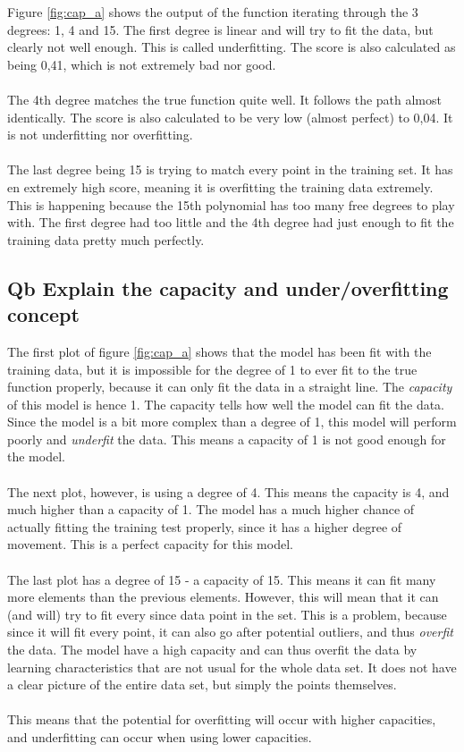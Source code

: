\documentclass{article}
\begin{document}
Figure \ref{fig:cap_a} shows the output of the function iterating through the 3 degrees: 1, 4 and 15. The first degree is linear and will try to fit the data, but clearly not well enough. This is called underfitting. The score is also calculated as being 0,41, which is not extremely bad nor good. 
\\ \\
The 4th degree matches the true function quite well. It follows the path almost identically. The score is also calculated to be very low (almost perfect) to 0,04. It is not underfitting nor overfitting.
\\ \\
The last degree being 15 is trying to match every point in the training set. It has en extremely high score, meaning it is overfitting the training data extremely. This is happening because the 15th polynomial has too many free degrees to play with. The first degree had too little and the 4th degree had  just enough to fit the training data pretty much perfectly. 

\subsection{Qb Explain the capacity and under/overfitting concept}

The first plot of figure  \ref{fig:cap_a} shows that the model has been fit with the training data, but it is impossible for the degree of 1 to ever fit to the true function properly, because it can only fit the data in a straight line. The \textit{capacity} of this model is hence 1. The capacity tells how well the model can fit the data. Since the model is a bit more complex than a degree of 1, this model will perform poorly and \textit{underfit} the data. This  means a capacity of 1 is not good enough for the model.
\\ \\
The next plot, however, is using a degree of 4. This means the capacity is 4, and much higher than a capacity of 1. The model has a much higher chance of actually fitting the training test properly, since it has a higher degree of movement. This is a perfect capacity for this model.
\\ \\
The last plot has a degree of 15 - a capacity of 15. This means it can fit many more elements than the previous elements. However, this will mean that it can (and will) try to fit every since data point in the set. This is a problem, because since it will fit every point, it can also go after potential outliers, and thus \textit{overfit} the data. The model have a high capacity and can thus overfit the data by learning characteristics that are not usual for the whole data set. It does not have a clear picture of the entire data set, but simply the points themselves.
\\ \\
This means that the potential for overfitting will occur with higher capacities, and underfitting can occur when using lower capacities. 
\end{document}
